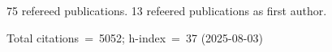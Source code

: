 75 refereed publications. 13 refeered publications as first author.

Total citations~=~5052; h-index~=~37 (2025-08-03)